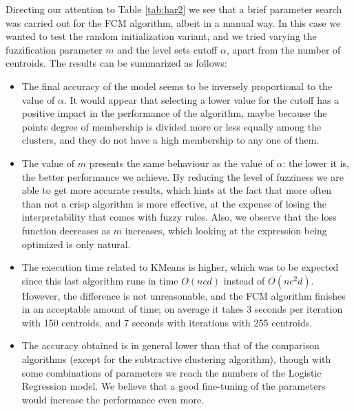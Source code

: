 Directing our attention to Table \ref{tab:har2} we see that a brief parameter search was carried out for the FCM algorithm, albeit in a manual way. In this case  we wanted to test the random initialization variant, and we tried varying the fuzzification parameter $m$ and the level sets cutoff $\alpha$, apart from the number of centroids. The results can be summarized as follows:

\begin{itemize}
  \item The final accuracy of the model seems to be inversely proportional to the value of $\alpha$. It would appear that selecting a lower value for the cutoff has a positive impact in the performance of the algorithm, maybe because the points degree of membership is divided more or less equally among the clusters, and they do not have a high membership to any one of them.
  \item The value of $m$ presents the same behaviour as the value of $\alpha$: the lower it is, the better performance we achieve. By reducing the level of fuzziness we are able to get more accurate results, which hints at the fact that more often than not a crisp algorithm is more effective, at the expense of losing the interpretability that comes with fuzzy rules. Also, we observe that the loss function decreases as $m$ increases, which looking at the expression being optimized is only natural.
  \item The execution time related to KMeans is higher, which was to be expected since this last algorithm runs in time $O(ncd)$ instead of $O(nc^2d)$. However, the difference is not unreasonable, and the FCM algorithm finishes in an acceptable amount of time; on average it takes 3 seconds per iteration with 150 centroids, and 7 seconds with iterations with 255 centroids.
  \item The accuracy obtained is in general lower than that of the comparison algorithms (except for the subtractive clustering algorithm), though with some combinations of parameters we reach the numbers of the Logistic Regression model. We believe that a good fine-tuning of the parameters would increase the performance even more.
\end{itemize}

